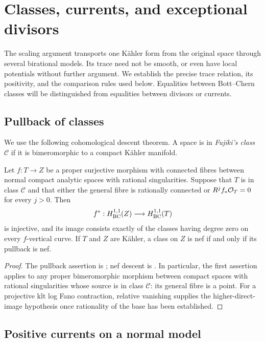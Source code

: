 \section{Classes, currents, and exceptional divisors}\label{sec:analytic}

The scaling argument transports one K\"ahler form from the original
space through several birational models.  Its trace need not be smooth,
or even have local potentials without further argument.  We establish
the precise trace relation, its positivity, and the comparison rules
used below.  Equalities between Bott--Chern classes will be distinguished
from equalities between divisors or currents.

\subsection{Pullback of classes}

We use the following cohomological descent theorem.  A space is in
\emph{Fujiki's class $\mathcal C$} if it is bimeromorphic to a compact
K\"ahler manifold.

\begin{lemma}\label{lem:pullback-image}
Let $f:T\to Z$ be a proper surjective morphism with connected fibres between normal
compact analytic spaces with rational singularities.  Suppose that $T$
is in class $\mathcal C$ and that either the general fibre is rationally
connected or $R^jf_*\mathcal O_T=0$ for every $j>0$.  Then
\[
 f^*: H^{1,1}_{\mathrm{BC}}(Z)\longrightarrow H^{1,1}_{\mathrm{BC}}(T)
\]
is injective, and its image consists exactly of the classes having
degree zero on every $f$-vertical curve.  If $T$ and $Z$ are K\"ahler,
a class on $Z$ is nef if and only if its pullback is nef.
\end{lemma}

\begin{proof}
The pullback assertion is \cite[Lemma~2.39]{HX2026}; nef descent is
\cite[Lemma~2.38]{DHP2024}.  In particular, the first assertion applies
to any proper bimeromorphic morphism between compact spaces with
rational singularities whose source is in class $\mathcal C$: its
general fibre is a point.  For a projective klt log Fano contraction,
relative vanishing supplies the higher-direct-image hypothesis once
rationality of the base has been established.
\end{proof}

\subsection{Positive currents on a normal model}

